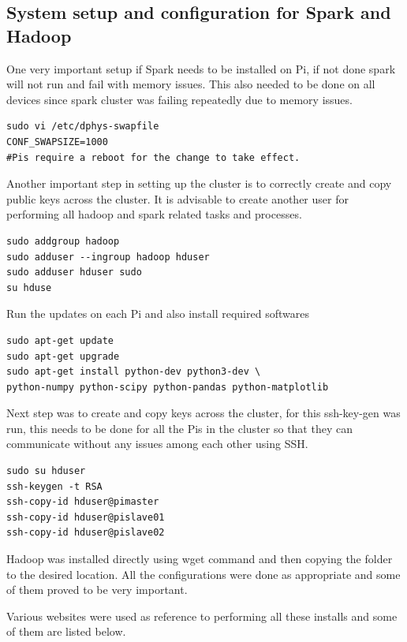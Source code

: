 \subsection{System setup and configuration for Spark and Hadoop}

One very important setup if Spark needs to be installed on Pi, if not
done spark will not run and fail with memory issues. This also needed
to be done on all devices since spark cluster was failing repeatedly
due to memory issues.

\begin{verbatim}
sudo vi /etc/dphys-swapfile
CONF_SWAPSIZE=1000
#Pis require a reboot for the change to take effect.
\end{verbatim}

Another important step in setting up the cluster is to correctly
create and copy public keys across the cluster. It is advisable to
create another user for performing all hadoop and spark related tasks
and processes.

\begin{verbatim}
sudo addgroup hadoop
sudo adduser --ingroup hadoop hduser
sudo adduser hduser sudo
su hduse
\end{verbatim}

Run the updates on each Pi and also install required softwares

\begin{verbatim}
sudo apt-get update
sudo apt-get upgrade
sudo apt-get install python-dev python3-dev \
python-numpy python-scipy python-pandas python-matplotlib
\end{verbatim}

Next step was to create and copy keys across the cluster, for this
ssh-key-gen was run, this needs to be done for all the Pis in the
cluster so that they can communicate without any issues among each
other using SSH.

\begin{verbatim}
sudo su hduser
ssh-keygen -t RSA
ssh-copy-id hduser@pimaster
ssh-copy-id hduser@pislave01
ssh-copy-id hduser@pislave02
\end{verbatim}

Hadoop was installed directly using wget command and then copying the
folder to the desired location.  All the configurations were done as
appropriate and some of them proved to be very important.

Various websites were used as reference to performing all these
installs and some of them are listed below.

